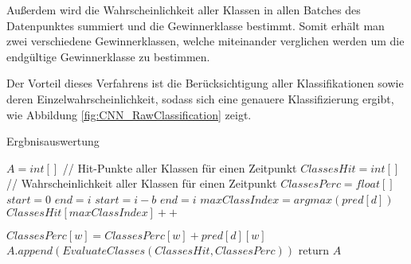         Außerdem wird die Wahrscheinlichkeit aller Klassen in allen Batches des Datenpunktes summiert und die Gewinnerklasse bestimmt.
        Somit erhält man zwei verschiedene Gewinnerklassen, welche miteinander verglichen werden um die endgültige Gewinnerklasse zu bestimmen.

        Der Vorteil dieses Verfahrens ist die Berücksichtigung aller Klassifikationen sowie deren Einzelwahrscheinlichkeit, sodass sich eine genauere Klassifizierung ergibt, wie Abbildung \ref{fig:CNN_RawClassification} zeigt.
        \begin{algorithm}\label{alg:Ergbnisauswertung}
            \caption{Ergbnisauswertung}
            \begin{algorithmic}[1]
                \State {}
                \State
                \State ${A} = int[ ]$
                    \State
                    \State // Hit-Punkte aller Klassen für einen Zeitpunkt
                    \State $ClassesHit = int[ ]$
                    \State // Wahrscheinlichkeit aller Klassen für einen Zeitpunkt
                    \State $ClassesPerc = float[ ]$
                    \State
                        \State $start = 0$
                        \State $end = i$
                    \Else
                        \State $start = i - b$
                        \State $end = i$
                    \EndIf
                    \State
                        \State $maxClassIndex = argmax(pred[d])$
                        \State $ClassesHit[maxClassIndex]++$

                            \State $ClassesPerc[w] = ClassesPerc[w] + pred[d][w]$
                        \EndFor
                    \EndFor
                    \State
                    \State $A.append(EvaluateClasses(ClassesHit, ClassesPerc))$
                    \State
                \EndFor
                \State return $A$
            \EndFunction
            \end{algorithmic}
        \end{algorithm}

